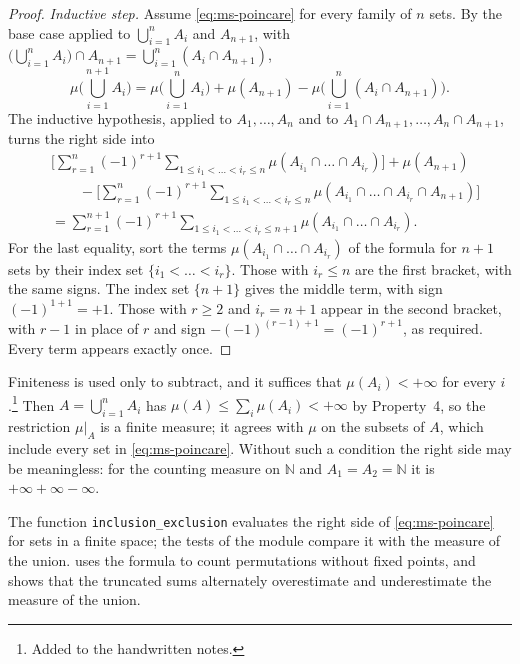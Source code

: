 \begin{proof}
\emph{Inductive step.} Assume \eqref{eq:ms-poincare} for every family of $n$ sets. By the base
case applied to $\bigcup_{i=1}^nA_i$ and $A_{n+1}$, with
$\big(\bigcup_{i=1}^nA_i\big)\cap A_{n+1}=\bigcup_{i=1}^n(A_i\cap A_{n+1})$,
\[
  \mu\Big(\bigcup_{i=1}^{n+1}A_i\Big)=\mu\Big(\bigcup_{i=1}^nA_i\Big)+\mu(A_{n+1})
  -\mu\Big(\bigcup_{i=1}^n(A_i\cap A_{n+1})\Big).
\]
The inductive hypothesis, applied to $A_1,\dots,A_n$ and to
$A_1\cap A_{n+1},\dots,A_n\cap A_{n+1}$, turns the right side into
\begin{align*}
  &\Big[\sum_{r=1}^n(-1)^{r+1}\sum_{1\le i_1<\dots<i_r\le n}\mu(A_{i_1}\cap\dots\cap A_{i_r})\Big]
  +\mu(A_{n+1})\\
  &\qquad-\Big[\sum_{r=1}^n(-1)^{r+1}\sum_{1\le i_1<\dots<i_r\le n}
  \mu(A_{i_1}\cap\dots\cap A_{i_r}\cap A_{n+1})\Big]\\
  &=\sum_{r=1}^{n+1}(-1)^{r+1}\sum_{1\le i_1<\dots<i_r\le n+1}\mu(A_{i_1}\cap\dots\cap A_{i_r}).
\end{align*}
For the last equality, sort the terms $\mu(A_{i_1}\cap\dots\cap A_{i_r})$ of the formula for
$n+1$ sets by their index set $\{i_1<\dots<i_r\}$. Those with $i_r\le n$ are the first bracket,
with the same signs. The index set $\{n+1\}$ gives the middle term, with sign
$(-1)^{1+1}=+1$. Those with $r\ge2$ and $i_r=n+1$ appear in the second bracket, with $r-1$ in
place of $r$ and sign $-(-1)^{(r-1)+1}=(-1)^{r+1}$, as required. Every term appears exactly once.
\end{proof}

\begin{remark}\label{rem:ms-inclusion-exclusion-finite}
Finiteness is used only to subtract, and it suffices that $\mu(A_i)<+\infty$ for every
$i$.\footnote{Added to the handwritten notes.}
Then $A=\bigcup_{i=1}^nA_i$ has $\mu(A)\le\sum_i\mu(A_i)<+\infty$ by Property~4, so the
restriction $\mu|_A$ is a finite measure; it agrees with $\mu$ on the subsets of $A$, which
include every set in \eqref{eq:ms-poincare}. Without such a condition the right side may be
meaningless: for the counting measure on $\mathbb N$ and $A_1=A_2=\mathbb N$ it is
$+\infty+\infty-\infty$.
\end{remark}

\begin{remark}[computational]\label{rem:ms-code-inclusion-exclusion}
The function \texttt{inclusion\_exclusion} evaluates the right side of
\eqref{eq:ms-poincare} for sets in a finite space; the tests of the module
 compare it with the measure of the union.  uses the formula to
count permutations without fixed points, and  shows that the
truncated sums alternately overestimate and underestimate the measure of the union.
\end{remark}

